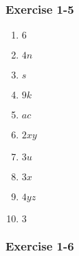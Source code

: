 {\begin{multicols}{3}
\subsubsection*{Exercise 1-5} %


\begin{enumerate}[label=\textbf{\arabic*}., noitemsep]
\item $6$%
\item $4n$%
\item $s$%
\item $9k$%
\item $ac$%
\item $2xy$%
\item $3u$%
\item $3x$%
\item $4yz$%
\item $3$%
\end{enumerate}


\subsubsection*{Exercise 1-6} %


\end{multicols}}
